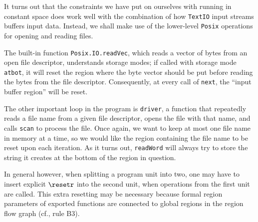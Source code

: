 \documentclass[12pt]{book}
\begin{document}
It turns out that the constraints we have put on ourselves with running
in constant space does work well with the combination of how
\texttt{TextIO} input streams buffers input data. Instead, we shall
make use of the lower-level \texttt{Posix} operations for opening and
reading files.

The built-in function {\tt Posix.IO.readVec}, which reads a vector of
bytes from an open file descriptor, understands storage modes; if
called with storage mode {\tt atbot}, it will reset the region where
the byte vector should be put before reading the bytes from the file
descriptor.  Consequently, at every call of {\tt next}, the ``input
buffer region'' will be reset.

The other important loop in the program is {\tt driver}, a function
that repeatedly reads a file name from a given file descriptor, opens the
file with that name, and calls {\tt scan} to process the file. Once
again, we want to keep at most one file name in memory at a time, so
we would like the region containing the file name to be reset upon
each iteration.  As it turns out, {\tt readWord} will always try to
store the string it creates at the bottom of the region in question.

In general however, when splitting a program unit into two, one may
have to insert explicit $\resetr$ into the second unit, when
operations from the first unit are called. This extra resetting may be
necessary because formal region parameters of exported functions are
connected to global regions in the region flow graph (cf., rule B3).
\end{document}
